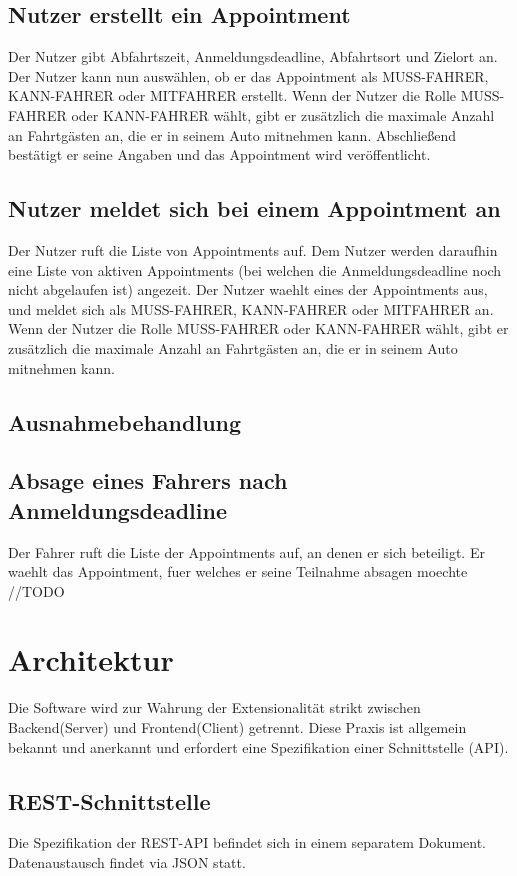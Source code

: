 \documentclass[11pt,a4paper]{article}
\begin{document}
\subsection*{Nutzer erstellt ein Appointment}
Der Nutzer gibt Abfahrtszeit, Anmeldungsdeadline, Abfahrtsort und Zielort an. Der Nutzer kann nun auswählen, ob er das Appointment als MUSS-FAHRER, KANN-FAHRER oder MITFAHRER erstellt. Wenn der Nutzer die Rolle MUSS-FAHRER oder KANN-FAHRER wählt, gibt er zusätzlich die maximale Anzahl an Fahrtgästen an, die er in seinem Auto mitnehmen kann. Abschließend bestätigt er seine Angaben und das Appointment wird veröffentlicht.

\subsection*{Nutzer meldet sich bei einem Appointment an}
Der Nutzer ruft die Liste von Appointments auf. Dem Nutzer werden daraufhin eine Liste von aktiven Appointments (bei welchen die Anmeldungsdeadline noch nicht abgelaufen ist) angezeit. Der Nutzer waehlt eines der Appointments aus, und meldet sich als MUSS-FAHRER, KANN-FAHRER oder MITFAHRER an. Wenn der Nutzer die Rolle MUSS-FAHRER oder KANN-FAHRER wählt, gibt er zusätzlich die maximale Anzahl an Fahrtgästen an, die er in seinem Auto mitnehmen kann.

\subsection{Ausnahmebehandlung}
\subsection*{Absage eines Fahrers nach Anmeldungsdeadline}
Der Fahrer ruft die Liste der Appointments auf, an denen er sich beteiligt. Er waehlt das Appointment, fuer welches er seine Teilnahme absagen moechte //TODO

\section{Architektur}
Die Software wird zur Wahrung der Extensionalität strikt zwischen Backend(Server) und Frontend(Client) getrennt. Diese Praxis ist allgemein bekannt und anerkannt und erfordert eine Spezifikation einer Schnittstelle (API).
\subsection{REST-Schnittstelle}
Die Spezifikation der REST-API befindet sich in einem separatem Dokument.
Datenaustausch findet via JSON statt.
\end{document}
